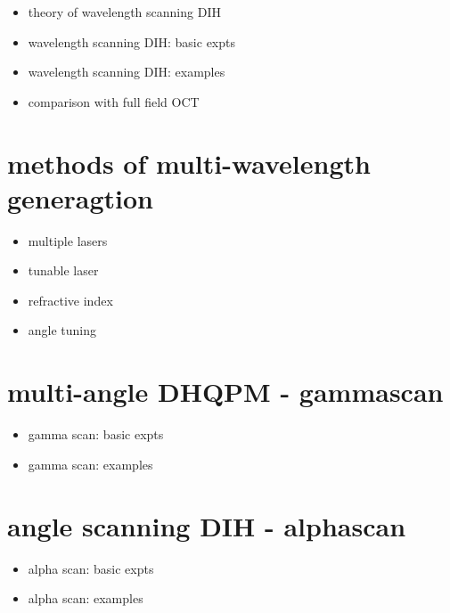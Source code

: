 \documentclass[t, aspectratio=169]{beamer}
\begin{document}
\begin{frame}{\secname}
	\begin{itemize}
		\item theory of wavelength scanning DIH
		\item wavelength scanning DIH: basic expts
		\item wavelength scanning DIH: examples
		\item comparison with full field OCT
	\end{itemize}
\end{frame}


\section{methods of multi-wavelength generagtion}

\begin{frame}{\secname}
	\begin{itemize}
		\item multiple lasers
		\item tunable laser
		\item refractive index
		\item angle tuning
	\end{itemize}
\end{frame}


\section{multi-angle DHQPM - gammascan}

\begin{frame}{\secname}
	\begin{itemize}
		\item gamma scan: basic expts
		\item gamma scan: examples
	\end{itemize}
\end{frame}


\section{angle scanning DIH - alphascan}

\begin{frame}{\secname}
	\begin{itemize}
		\item alpha scan: basic expts
		\item alpha scan: examples
	\end{itemize}
\end{frame}
\end{document}
